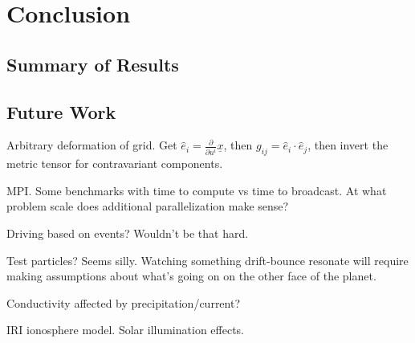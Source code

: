 
\chapter{Conclusion}
  \label{ch_conclusion}

\section{Summary of Results}


\section{Future Work}

Arbitrary deformation of grid. Get $\hat{e}_i = \frac{\partial}{\partial u^i} \underline{x}$, then $g_{ij} = \hat{e}_i \cdot \hat{e}_j$, then invert the metric tensor for contravariant components.  

MPI. Some benchmarks with time to compute vs time to broadcast. At what problem scale does additional parallelization make sense? 

Driving based on events? Wouldn't be that hard. 

Test particles? Seems silly. Watching something drift-bounce resonate will require making assumptions about what's going on on the other face of the planet.  

Conductivity affected by precipitation/current? 

IRI ionosphere model. Solar illumination effects. 
